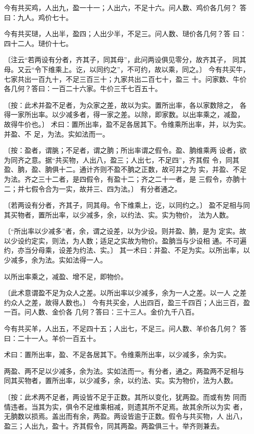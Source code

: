 \documentclass[a4paper,12pt,UTF8,twoside]{ctexbook}
\begin{document}
今有共买鸡，人出九，盈一十一；人出六，不足十六。问人数、鸡价各几何？ 答曰：九人。鸡价七十。

今有共买琎，人出半，盈四；人出少半，不足三。问人数、琎价各几何？答 曰：四十二人。琎价十七。

〔注云“若两设有分者，齐其子，同其母”，此问两设俱见零分，故齐其子， 同其母。又云“令下维乘上。讫，以同约之”，不可约，故以乘，同之。〕 今有共买牛，七家共出一百九十，不足三百三十；九家共出二百七十，盈三 十。问家数、牛价各几何？答曰：一百二十六家。牛价三千七百五十。

〔按：此术并盈不足者，为众家之差，故以为实。置所出率，各以家数除之， 各得一家所出率。以少减多者，得一家之差。以除，即家数。以出率乘之，减盈， 故得牛价也。〕 术曰：置所出率，盈不足各居其下。令维乘所出率，并，以为实。并盈、不 足，为法。实如法而一。

〔按：盈者，谓朓；不足者，谓之朒；所出率谓之假令。盈、朒维乘两 设者，欲为同齐之意。据“共买物，人出八，盈三；人出七，不足四”，齐其假 令，同其盈、朒，盈、朒俱十二。通计齐则不盈不朒之正数，故可并之为 实，并盈、不足为法。齐之三十二者，是四假令，有盈十二；齐之二十一者，是 三假令，亦朒十二；并七假令合为一实，故并三、四为法。〕 有分者通之。

〔若两设有分者，齐其子，同其母。令下维乘上，讫，以同约之。〕 盈不足相与同其买物者，置所出率，以少减多，余，以约法、实。实为物价， 法为人数。

〔“所出率以少减多”者，余，谓之设差，以为少设。则并盈、朒，是为 定实。故以少设约定实，则法，为人数；适足之实故为物价。盈朒当与少设相 通。不可遍约，亦当分母乘，设差为约法、实。〕 其一术曰：并盈、不足为实。以所出率，以少减多，余为法。实如法得一人。

以所出率乘之，减盈、增不足，即物价。

〔此术意谓盈不足为众人之差。以所出率以少减多，余为一人之差。以一人 之差约众人之差，故得人数也。〕 今有共买金，人出四百，盈三千四百；人出三百，盈一百。问人数、金价各 几何？答曰：三十三人。金价九千八百。

今有共买羊，人出五，不足四十五；人出七，不足三。问人数、羊价各几何？ 答曰：二十一人。羊价一百五十。

术曰：置所出率，盈、不足各居其下。令维乘所出率，以少减多，余为实。

两盈、两不足以少减多，余为法。实如法而一。有分者，通之。两盈两不足相与 同其买物者，置所出率，以少减多，余，以约法、实。实为物价，法为人数。

〔按：此术两不足者，两设皆不足于正数。其所以变化，犹两盈。而或有势 同而情违者。当其为实，俱令不足维乘相减，则遗其所不足焉。故其余所以为实 者，无朒数以损焉。盖出而有余，两盈。两设皆逾于正数。假令与共买物，人 出八，盈三；人出九，盈十。齐其假令，同其两盈。两盈俱三十。举齐则兼去。
\end{document}
